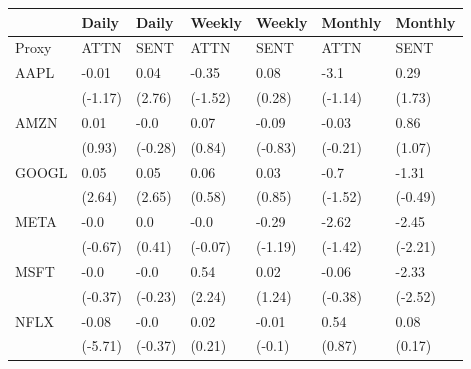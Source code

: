 \begin{tabular}{lllllll}
\toprule
{} &    Daily &    Daily &   Weekly &   Weekly &  Monthly &  Monthly \\
\midrule
Proxy &     ATTN &     SENT &     ATTN &     SENT &     ATTN &     SENT \\
AAPL  &    -0.01 &     0.04 &    -0.35 &     0.08 &     -3.1 &     0.29 \\
      &  (-1.17) &   (2.76) &  (-1.52) &   (0.28) &  (-1.14) &   (1.73) \\
AMZN  &     0.01 &     -0.0 &     0.07 &    -0.09 &    -0.03 &     0.86 \\
      &   (0.93) &  (-0.28) &   (0.84) &  (-0.83) &  (-0.21) &   (1.07) \\
GOOGL &     0.05 &     0.05 &     0.06 &     0.03 &     -0.7 &    -1.31 \\
      &   (2.64) &   (2.65) &   (0.58) &   (0.85) &  (-1.52) &  (-0.49) \\
META  &     -0.0 &      0.0 &     -0.0 &    -0.29 &    -2.62 &    -2.45 \\
      &  (-0.67) &   (0.41) &  (-0.07) &  (-1.19) &  (-1.42) &  (-2.21) \\
MSFT  &     -0.0 &     -0.0 &     0.54 &     0.02 &    -0.06 &    -2.33 \\
      &  (-0.37) &  (-0.23) &   (2.24) &   (1.24) &  (-0.38) &  (-2.52) \\
NFLX  &    -0.08 &     -0.0 &     0.02 &    -0.01 &     0.54 &     0.08 \\
      &  (-5.71) &  (-0.37) &   (0.21) &   (-0.1) &   (0.87) &   (0.17) \\
\bottomrule
\end{tabular}
